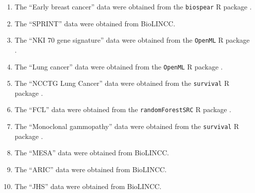 \documentclass[12pt]{article}\usepackage[]{graphicx}\usepackage[]{xcolor}
\begin{document}
\begin{enumerate}
 \item The ``Early breast cancer'' data \citep{desmedt2011multifactorial, hatzis2011genomic, ternes2017identification} were obtained from the \texttt{biospear} R package \citep{biospear}. 
 \item The ``SPRINT'' data \citep{sprint2015randomized} were obtained from BioLINCC. 
 \item The ``NKI 70 gene signature'' data \citep{van2002gene} were obtained from the \texttt{OpenML} R package \citep{OpenML}. 
 \item The ``Lung cancer'' data \citep{director2008gene} were obtained from the \texttt{OpenML} R package \citep{OpenML}. 
 \item The ``NCCTG Lung Cancer'' data \citep{loprinzi1994prospective} were obtained from the \texttt{survival} R package \citep{survival}. 
 \item The ``FCL'' data \citep{pintilie2006competing} were obtained from the \texttt{randomForestSRC} R package \citep{randomForestSRC}. 
 \item The ``Monoclonal gammopathy'' data \citep{kyle2002long} were obtained from the \texttt{survival} R package \citep{survival}. 
 \item The ``MESA'' data \citep{bild2002multi} were obtained from BioLINCC. 
 \item The ``ARIC'' data \citep{aric1989atherosclerosis} were obtained from BioLINCC. 
 \item The ``JHS'' data \citep{taylor2005toward} were obtained from BioLINCC.

\end{enumerate}
\end{document}

